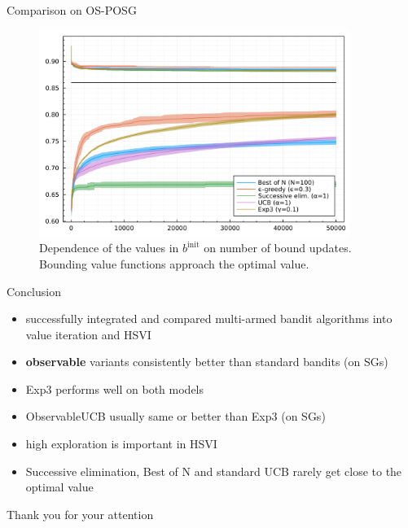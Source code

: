 \documentclass{beamer}
\begin{document}
\begin{frame}{Comparison on OS-POSG}
    \begin{figure}
        \centering
        \includegraphics[width=0.9\textwidth]{./easier_discount_095.png}
        \caption{Dependence of the values in $b^{\text{init}}$ on number of bound updates. Bounding value functions approach the optimal value.}
    \end{figure}
\end{frame}

\begin{frame}{Conclusion}
    \begin{itemize}
        \item successfully integrated and compared multi-armed bandit algorithms into value iteration and HSVI
        \item \textbf{observable} variants consistently better than standard bandits (on SGs)
        \item Exp3 performs well on both models
        \item ObservableUCB usually same or better than Exp3 (on SGs)
        \item high exploration is important in HSVI
        \item Successive elimination, Best of N and standard UCB rarely get close to the optimal value
    \end{itemize}
\end{frame}

\begin{frame}
    Thank you for your attention
\end{frame}

\appendix
\end{document}
